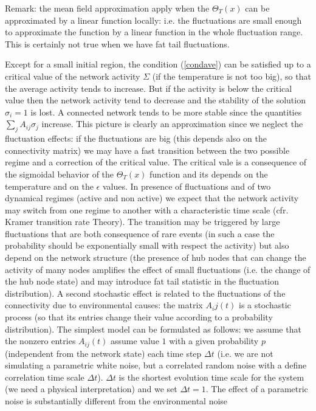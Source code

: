 Remark: the mean field approximation apply when the $\Theta_T(x)$ can be approximated by a linear function locally: i.e. the fluctuations are small
enough to approximate the function by a linear function in the whole fluctuation range. This is certainly not true when we have fat tail fluctuations.
\par\noindent
Except for a small initial region, the condition (\ref{condave}) can be satisfied up to a critical value of the network activity $\Sigma$ (if the temperature
is not too big), so that the average activity tends to increase. But if the activity is below the critical value then the network activity tend to decrease and
the stability of the solution $\sigma_i=1$ is lost. A connected network tends to be more stable since the quantities
$\sum_j A_{ij}\sigma_j$ increase.  This picture is clearly an approximation since we neglect the fluctuation effects: if the fluctuations are big (this
depends also on the connectivity matrix) we may have a fast transition between the two possible regime and a correction of the critical value. The
critical vale is a consequence of the sigmoidal behavior of the $\Theta_T(x)$ function and its depends on the temperature and on the $\epsilon$
values. In presence of fluctuations and of two dynamical regimes (active and non active) we expect that the network activity may switch from one regime
to another with a characteristic time scale (cfr. Kramer transition rate Theory). The transition may be triggered by large fluctuations that are both consequence
of rare events (in such a case the probability should be exponentially small with respect the activity) but also depend on the network structure (the presence of
hub nodes that can change the activity of many nodes amplifies the effect of small fluctuations (i.e. the change of the hub node state) and may introduce
fat tail statistic in the fluctuation distribution). A second stochastic effect is related to the fluctuations of the connectivity due to environmental causes: 
the matrix $A_ij(t)$ is a stochastic process (so that its entries change their value according to a probability distribution). The simplest model can be formulated as
follows: we assume that the nonzero entries $A_{ij}(t)$ assume value $1$ with a given probability $p$ (independent from the network state)
 each time step $\Delta t$ (i.e. we are not simulating
a parametric white noise, but a correlated random noise with a define correlation time scale $\Delta t$). $\Delta t$ is the shortest evolution time scale
for the system (we need a physical interpretation) and we set $\Delta t=1$. The effect of a parametric noise is substantially different from the environmental noise
